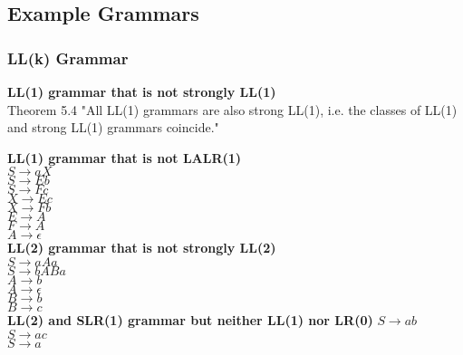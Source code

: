 \subsection{Example Grammars}
\begin{samepage}
\subsubsection{LL(k) Grammar}
\textbf{LL(1) grammar that is not strongly LL(1)}\\ %
    Theorem 5.4 "All LL(1) grammars are also strong LL(1), i.e. the classes of LL(1) and strong LL(1) grammars coincide."

\textbf{LL(1) grammar that is not LALR(1)}\\ %
    $S\rightarrow aX$\\
    $S\rightarrow Eb$\\
    $S\rightarrow F c$\\
    $X\rightarrow Ec$\\
    $X\rightarrow F b$\\
    $E\rightarrow A$\\
    $F\rightarrow A$\\
    $A\rightarrow \epsilon$\\

\textbf{LL(2) grammar that is not strongly LL(2)}\\ %
    $S \rightarrow aAa$\\
    $S \rightarrow bABa$\\
    $A \rightarrow b$\\
    $A \rightarrow \epsilon$\\
    $B \rightarrow b$\\
    $B \rightarrow c$\\

\textbf{LL(2) and SLR(1) grammar but neither LL(1) nor LR(0)} %
    $S\rightarrow ab$\\
    $S\rightarrow ac$\\
    $S\rightarrow a$\\
\end{samepage}
